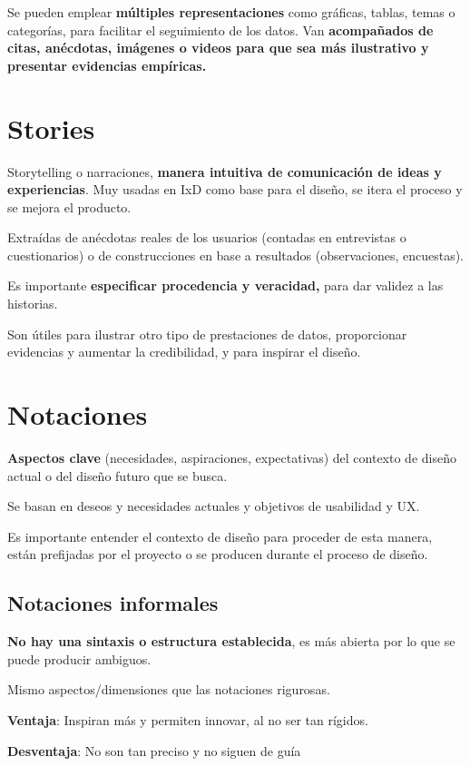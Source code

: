 \documentclass[12pt]{report} %
\begin{document}
Se pueden emplear \textbf{múltiples representaciones} como gráficas,
tablas, temas o categorías, para facilitar el seguimiento de los datos.
Van \textbf{acompañados de citas, anécdotas, imágenes o videos para que
sea más ilustrativo y presentar evidencias empíricas.}

\section{Stories}

Storytelling o narraciones, \textbf{manera intuitiva de comunicación de
ideas y experiencias}. Muy usadas en IxD como base para el diseño, se
itera el proceso y se mejora el producto.

Extraídas de anécdotas reales de los usuarios (contadas en entrevistas o
cuestionarios) o de construcciones en base a resultados (observaciones,
encuestas).

Es importante \textbf{especificar procedencia y veracidad,} para dar
validez a las historias.

Son útiles para ilustrar otro tipo de prestaciones de datos,
proporcionar evidencias y aumentar la credibilidad, y para inspirar el
diseño.

\section{Notaciones}

\textbf{Aspectos clave} (necesidades, aspiraciones, expectativas) del
contexto de diseño actual o del diseño futuro que se busca.

Se basan en deseos y necesidades actuales y objetivos de usabilidad y
UX.

Es importante entender el contexto de diseño para proceder de esta
manera, están prefijadas por el proyecto o se producen durante el
proceso de diseño.

\subsection{Notaciones informales}

\textbf{No hay una sintaxis o estructura establecida}, es más abierta
por lo que se puede producir ambiguos.

Mismo aspectos/dimensiones que las notaciones rigurosas.

\textbf{Ventaja}: Inspiran más y permiten innovar, al no ser tan
rígidos.

\textbf{Desventaja}: No son tan preciso y no siguen de guía
\end{document}
